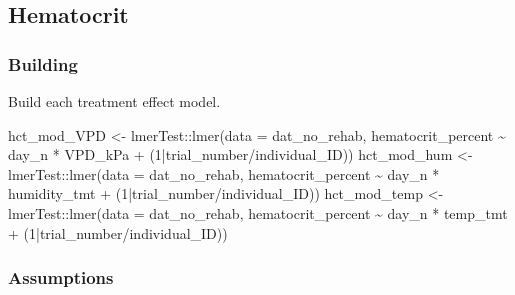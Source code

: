 \documentclass[
]{article}
\newenvironment{Shaded}{\begin{snugshade}}{\end{snugshade}}
\newcommand{\AttributeTok}[1]{\textcolor[rgb]{0.77,0.63,0.00}{#1}}
\newcommand{\DecValTok}[1]{\textcolor[rgb]{0.00,0.00,0.81}{#1}}
\newcommand{\FunctionTok}[1]{\textcolor[rgb]{0.00,0.00,0.00}{#1}}
\newcommand{\NormalTok}[1]{#1}
\newcommand{\OtherTok}[1]{\textcolor[rgb]{0.56,0.35,0.01}{#1}}
\newcommand{\SpecialCharTok}[1]{\textcolor[rgb]{0.00,0.00,0.00}{#1}}
\begin{document}
\hypertarget{hematocrit}{%
\subsection{Hematocrit}\label{hematocrit}}

\hypertarget{building-1}{%
\subsubsection{Building}\label{building-1}}

Build each treatment effect model.

\begin{Shaded}
\begin{Highlighting}[]
\NormalTok{hct\_mod\_VPD }\OtherTok{\textless{}{-}}\NormalTok{ lmerTest}\SpecialCharTok{::}\FunctionTok{lmer}\NormalTok{(}\AttributeTok{data =}\NormalTok{ dat\_no\_rehab,}
\NormalTok{                               hematocrit\_percent }\SpecialCharTok{\textasciitilde{}}\NormalTok{ day\_n }\SpecialCharTok{*}\NormalTok{ VPD\_kPa }\SpecialCharTok{+}
\NormalTok{                              (}\DecValTok{1}\SpecialCharTok{|}\NormalTok{trial\_number}\SpecialCharTok{/}\NormalTok{individual\_ID))}
\NormalTok{hct\_mod\_hum }\OtherTok{\textless{}{-}}\NormalTok{ lmerTest}\SpecialCharTok{::}\FunctionTok{lmer}\NormalTok{(}\AttributeTok{data =}\NormalTok{ dat\_no\_rehab,}
\NormalTok{                              hematocrit\_percent }\SpecialCharTok{\textasciitilde{}}\NormalTok{ day\_n }\SpecialCharTok{*}\NormalTok{ humidity\_tmt }\SpecialCharTok{+}
\NormalTok{                              (}\DecValTok{1}\SpecialCharTok{|}\NormalTok{trial\_number}\SpecialCharTok{/}\NormalTok{individual\_ID))}
\NormalTok{hct\_mod\_temp }\OtherTok{\textless{}{-}}\NormalTok{ lmerTest}\SpecialCharTok{::}\FunctionTok{lmer}\NormalTok{(}\AttributeTok{data =}\NormalTok{ dat\_no\_rehab,}
\NormalTok{                              hematocrit\_percent }\SpecialCharTok{\textasciitilde{}}\NormalTok{ day\_n }\SpecialCharTok{*}\NormalTok{ temp\_tmt }\SpecialCharTok{+}
\NormalTok{                              (}\DecValTok{1}\SpecialCharTok{|}\NormalTok{trial\_number}\SpecialCharTok{/}\NormalTok{individual\_ID))}
\end{Highlighting}
\end{Shaded}

\hypertarget{assumptions-1}{%
\subsubsection{Assumptions}\label{assumptions-1}}
\end{document}
